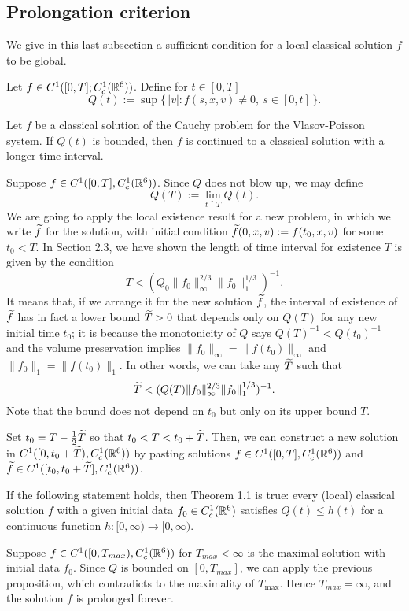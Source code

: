 \documentclass[11pt]{amsart}
\begin{document}
\subsection{Prolongation criterion}
We give in this last subsection a sufficient condition for a local classical solution $f$ to be global.
\begin{defn}
Let $f\in C^1([0,T];C_c^1(\mathbb{R}^6))$.
Define for $t\in[0,T]$
\[Q(t):=\sup\{\,|v|:f(s,x,v)\ne0,\ s\in[0,t]\,\}.\]
\end{defn}
\begin{prop}
Let $f$ be a classical solution of the Cauchy problem for the Vlasov-Poisson system.
If $Q(t)$ is bounded, then $f$ is continued to a classical solution with a longer time interval.
\end{prop}
\begin{pf}
Suppose $f\in C^1([0,T],C_c^1(\mathbb{R}^6))$.
Since $Q$ does not blow up, we may define
\[Q(T):=\lim_{t\uparrow T}Q(t).\]
We are going to apply the local existence result for a new problem, in which we write $\widetilde f$ for the solution, with initial condition $\widetilde f(0,x,v):=f(t_0,x,v)$ for some $t_0<T$.
In Section 2.3, we have shown the length of time interval for existence $T$ is given by the condition
\[T<(Q_0\|f_0\|_\infty^{2/3}\|f_0\|_1^{1/3})^{-1}.\]
It means that, if we arrange it for the new solution $\widetilde f$, the interval of existence of $\widetilde f$ has in fact a lower bound $\widetilde T>0$ that depends only on $Q(T)$ for any new initial time $t_0$; it is because the monotonicity of $Q$ says $Q(T)^{-1}<Q(t_0)^{-1}$ and the volume preservation implies $\|f_0\|_\infty=\|f(t_0)\|_\infty$ and $\|f_0\|_1=\|f(t_0)\|_1$.
In other words, we can take any $\widetilde T$ such that
\[\widetilde T<(Q(T)\|f_0\|_\infty^{2/3}\|f_0\|_1^{1/3})^{-1}.\]
Note that the bound does not depend on $t_0$ but only on its upper bound $T$.

Set $t_0=T-\frac12\widetilde T$ so that $t_0<T<t_0+\widetilde T$.
Then, we can construct a new solution in $C^1([0,t_0+\widetilde T),C_c^1(\mathbb{R}^6))$ by pasting solutions $f\in C^1([0,T],C_c^1(\mathbb{R}^6))$ and $\widetilde f\in C^1([t_0,t_0+\widetilde T],C_c^1(\mathbb{R}^6))$.
\end{pf}

\begin{cor}
If the following statement holds, then Theorem 1.1 is true: every (local) classical solution $f$ with a given initial data $f_0\in C_c^1(\mathbb{R}^6)$ satisfies $Q(t)\le h(t)$ for a continuous function $h:[0,\infty)\to[0,\infty)$.
\end{cor}
\begin{pf}
Suppose $f\in C^1([0,T_{max}),C_c^1(\mathbb{R}^6))$ for $T_{max}<\infty$ is the maximal solution with initial data $f_0$.
Since $Q$ is bounded on $[0,T_{max}]$, we can apply the previous proposition, which contradicts to the maximality of $T_{\max}$.
Hence $T_{max}=\infty$, and the solution $f$ is prolonged forever.
\end{pf}
\end{document}
